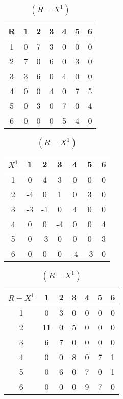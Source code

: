 \begin{table}[h!]
  \scriptsize

  \centering
  
  \begin{minipage}{0.32\textwidth}
    \centering

    \caption{$(R)$}

    \label{tab:R1}

    \begin{tabular}{|c|cccccc|} 
      \hline
      R&1&2&3&4&5&6 \\ \hline
      1&0&7&3&0&0&0 \\ 
      2&7&0&6&0&3&0 \\ 
      3&3&6&0&4&0&0 \\ 
      4&0&0&4&0&7&5 \\ 
      5&0&3&0&7&0&4 \\ 
      6&0&0&0&5&4&0 \\ \hline
    \end{tabular}
  \end{minipage}
  \begin{minipage}{0.32\textwidth}
    \centering

    \caption{$(X^1)$}

    \label{tab:X1}

    \begin{tabular}{|c|cccccc|} 
      \hline
      $X^1$&1&2&3&4&5&6 \\ \hline
      1&0 & 4& 3& 0& 0&0 \\ 
      2&-4& 0& 1& 0& 3&0 \\ 
      3&-3&-1& 0& 4& 0&0 \\ 
      4&0 & 0&-4& 0& 0&4 \\ 
      5&0 &-3& 0& 0& 0&3 \\ 
      6&0 & 0& 0&-4&-3&0 \\ \hline
    \end{tabular}
  \end{minipage}
  \begin{minipage}{0.32\textwidth}
    \centering

    \caption{$(R - X^1)$}

    \label{tab:RX1}

    \begin{tabular}{|c|cccccc|} 
      \hline
      $R-X^1$&1&2&3&4&5&6 \\ \hline
      1&0 & 3& 0& 0& 0&0 \\ 
      2&11& 0& 5& 0& 0&0 \\ 
      3&6 & 7& 0& 0& 0&0 \\ 
      4&0 & 0& 8& 0& 7&1 \\ 
      5&0 & 6& 0& 7& 0&1 \\ 
      6&0 & 0& 0& 9& 7&0 \\ \hline
    \end{tabular}
  \end{minipage}
\end{table}

